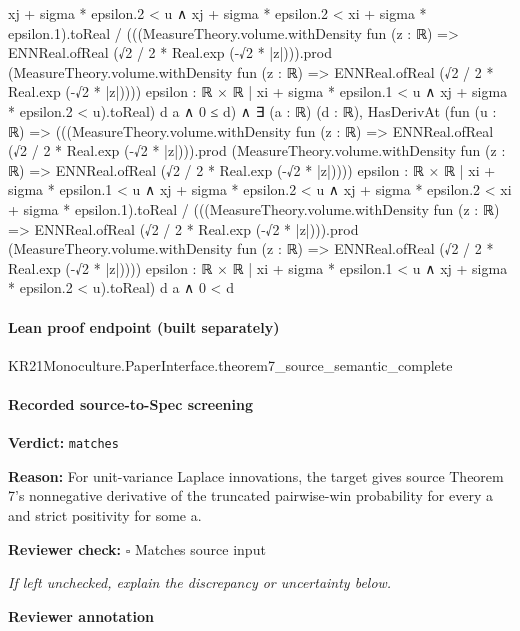 \documentclass[10pt]{article}
\newcommand{\reviewerbox}{%
  \par\noindent\fbox{\parbox{0.96\linewidth}{\rule{0pt}{0.38in}}}\par
}
\newcommand{\reviewmatch}[1]{%
  \par\noindent\textbf{Reviewer check:} $\square$\; #1\par
  \noindent\emph{If left unchecked, explain the discrepancy or uncertainty below.}\par
}
\begin{document}
\begin{ReviewVerbatim}
{                              xj + sigma * epsilon.2 < u ∧ xj + sigma * epsilon.2 < xi + sigma * epsilon.1}).toReal /
                      (((MeasureTheory.volume.withDensity fun (z : ℝ) =>
                                ENNReal.ofReal (√2 / 2 * Real.exp (-√2 * |z|))).prod
                            (MeasureTheory.volume.withDensity fun (z : ℝ) =>
                              ENNReal.ofReal (√2 / 2 * Real.exp (-√2 * |z|))))
                          {epsilon : ℝ × ℝ | xi + sigma * epsilon.1 < u ∧ xj + sigma * epsilon.2 < u}).toReal)
                  d a ∧
                0 ≤ d) ∧
        ∃ (a : ℝ) (d : ℝ),
          HasDerivAt
              (fun (u : ℝ) =>
                (((MeasureTheory.volume.withDensity fun (z : ℝ) => ENNReal.ofReal (√2 / 2 * Real.exp (-√2 * |z|))).prod
                        (MeasureTheory.volume.withDensity fun (z : ℝ) =>
                          ENNReal.ofReal (√2 / 2 * Real.exp (-√2 * |z|))))
                      {epsilon : ℝ × ℝ |
                        xi + sigma * epsilon.1 < u ∧
                          xj + sigma * epsilon.2 < u ∧ xj + sigma * epsilon.2 < xi + sigma * epsilon.1}).toReal /
                  (((MeasureTheory.volume.withDensity fun (z : ℝ) =>
                            ENNReal.ofReal (√2 / 2 * Real.exp (-√2 * |z|))).prod
                        (MeasureTheory.volume.withDensity fun (z : ℝ) =>
                          ENNReal.ofReal (√2 / 2 * Real.exp (-√2 * |z|))))
                      {epsilon : ℝ × ℝ | xi + sigma * epsilon.1 < u ∧ xj + sigma * epsilon.2 < u}).toReal)
              d a ∧
            0 < d
\end{ReviewVerbatim}

\paragraph{Lean proof endpoint (built separately)}\begin{ReviewVerbatim}
KR21Monoculture.PaperInterface.theorem7_source_semantic_complete
\end{ReviewVerbatim}

\paragraph{Recorded source-to-Spec screening}
\textbf{Verdict:} \texttt{matches}
\\
{\raggedright
\textbf{Reason:} For unit-\allowbreak{}variance Laplace innovations, the target gives source Theorem 7's nonnegative derivative of the truncated pairwise-\allowbreak{}win probability for every a and strict positivity for some a.\allowbreak{}
\par}
\reviewmatch{Matches source input}
\noindent\textbf{Reviewer annotation}\par
\reviewerbox
\clearpage
\hypertarget{source-claim-fb611bb534f07b11}{}
\end{document}
